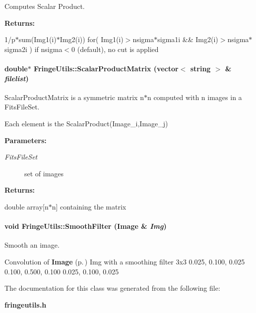 Computes Scalar Product.

\begin{Desc}
\item[{\bf Returns: }]\par
1/p$\ast$sum(Img1(i)$\ast$Img2(i)) for( Img1(i)$>$nsigma$\ast$sigma1i \&\& Img2(i)$>$nsigma$\ast$sigma2i ) if nsigma$<$0 (default), no cut is applied \end{Desc}
\paragraph{\setlength{\rightskip}{0pt plus 5cm}double$\ast$ Fringe\-Utils::Scalar\-Product\-Matrix (vector$<$ string $>$ \& {\em filelist})\hspace{0.3cm}{\tt  [static]}}\hfill\label{class_fringeutils_d3}


Scalar\-Product\-Matrix is a symmetric matrix n$\ast$n computed with n images in a Fits\-File\-Set.

Each element is the Scalar\-Product(Image\_\-i,Image\_\-j)  \begin{Desc}
\item[{\bf Parameters: }]\par
\begin{description}
\item[
{\em Fits\-File\-Set}]set of images \end{description}
\end{Desc}
\begin{Desc}
\item[{\bf Returns: }]\par
double array[n$\ast$n] containing the matrix \end{Desc}
\paragraph{\setlength{\rightskip}{0pt plus 5cm}void Fringe\-Utils::Smooth\-Filter ({\bf Image} \& {\em Img})\hspace{0.3cm}{\tt  [static]}}\hfill\label{class_fringeutils_d2}


Smooth an image.

Convolution of {\bf Image} {\rm (p.\,\pageref{class_image})} Img with a smoothing filter 3x3 0.025, 0.100, 0.025 0.100, 0.500, 0.100 0.025, 0.100, 0.025 

The documentation for this class was generated from the following file:\begin{CompactItemize}
\item 
{\bf fringeutils.h}\end{CompactItemize}
